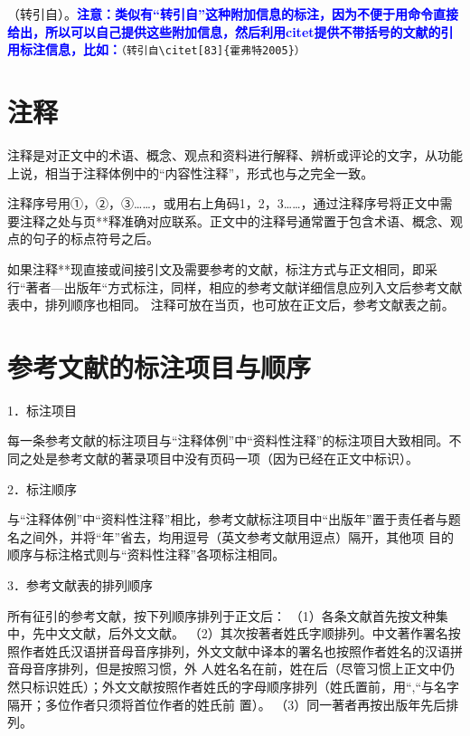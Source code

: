 \documentclass{article}
\newcommand{\qd}[1]{\textbf{\textcolor{blue}{#1}}}
\begin{document}
（转引自\citet[83]{霍弗特2005}）。\qd{注意：类似有“转引自”这种附加信息的标注，因为不便于用命令直接给出，所以可以自己提供这些附加信息，然后利用citet提供不带括号的文献的引用标注信息，比如：}\verb|（转引自\citet[83]{霍弗特2005}）|

\section{注释}
注释是对正文中的术语、概念、观点和资料进行解释、辨析或评论的文字，从功能上说，相当于注释体例中的“内容性注释”，形式也与之完全一致。

注释序号用①，②，③……，或用右上角码1，2，3……，通过注释序号将正文中需要注释之处与页**释准确对应联系。正文中的注释号通常置于包含术语、概念、观点的句子的标点符号之后。

如果注释**现直接或间接引文及需要参考的文献，标注方式与正文相同，即采行“著者—出版年“方式标注，同样，相应的参考文献详细信息应列入文后参考文献表中，排列顺序也相同。
注释可放在当页，也可放在正文后，参考文献表之前。


\section{参考文献的标注项目与顺序}

1．标注项目

每一条参考文献的标注项目与“注释体例”中“资料性注释”的标注项目大致相同。不同之处是参考文献的著录项目中没有页码一项（因为已经在正文中标识）。

2．标注顺序

与“注释体例”中“资料性注释”相比，参考文献标注项目中“出版年”置于责任者与题名之间外，并将“年”省去，均用逗号（英文参考文献用逗点）隔开，其他项
目的顺序与标注格式则与“资料性注释”各项标注相同。

3．参考文献表的排列顺序

所有征引的参考文献，按下列顺序排列于正文后：
（1）各条文献首先按文种集中，先中文文献，后外文文献。
（2）其次按著者姓氏字顺排列。中文著作署名按照作者姓氏汉语拼音母音序排列，外文文献中译本的署名也按照作者姓名的汉语拼音母音序排列，但是按照习惯，外
人姓名名在前，姓在后（尽管习惯上正文中仍然只标识姓氏）；外文文献按照作者姓氏的字母顺序排列（姓氏置前，用“,“与名字隔开；多位作者只须将首位作者的姓氏前
置）。
（3）同一著者再按出版年先后排列。




\newpage
\nocite{*}
\printbibliography[heading=bibliography]
\end{document}
